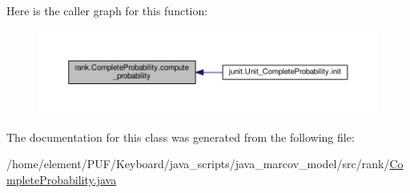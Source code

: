 Here is the caller graph for this function\+:\nopagebreak
\begin{figure}[H]
\begin{center}
\leavevmode
\includegraphics[width=350pt]{classrank_1_1_complete_probability_a1507b6695918da300c0130ccdc218900_icgraph}
\end{center}
\end{figure}




The documentation for this class was generated from the following file\+:\begin{DoxyCompactItemize}
\item 
/home/element/\+P\+U\+F/\+Keyboard/java\+\_\+scripts/java\+\_\+marcov\+\_\+model/src/rank/\hyperlink{_complete_probability_8java}{Complete\+Probability.\+java}\end{DoxyCompactItemize}
